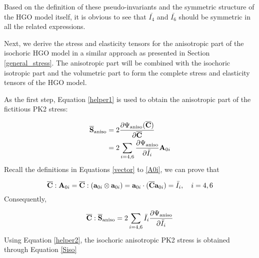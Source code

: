 Based on the definition of these pseudo-invariants and the symmetric structure of the HGO model itself, it is obvious to see that $\bar{I_4}$ and $\bar{I_6}$ should be symmetric in all the related expressions. 

Next, we derive the stress and elasticity tensors for the anisotropic part of the isochoric HGO model in a similar approach as presented in Section \ref{general_stress}. The anisotropic part will be combined with the isochoric isotropic part and the volumetric part to form the complete stress and elasticity tensors of the HGO model.

As the first step, Equation \ref{helper1} is used to obtain the anisotropic part of the fictitious PK2 stress:

\begin{equation} \label{Sbar3}
\begin{split}
\overline{\bold{S}}_\mathrm{aniso} &=  2\frac{\partial\Psi_\mathrm{aniso}({\overline{\bold{C}})}}{\partial\overline{\bold{C}}} \\
&= 2\sum_{i = 4, 6}\frac{\partial{\Psi_\mathrm{aniso}}}{\partial{\bar{I}_i}}\bold{A}_{0i} 
\end{split}
\end{equation}
Recall the definitions in Equations \ref{vector} to \ref{A0i}, we can prove that

\begin{equation}
\overline{\bold{C}} : \bold{A}_{0i} = \overline{\bold{C}} : (\bold{a}_{0i} \otimes \bold{a}_{0i}) = \bold{a}_{0i} \cdot (\overline{\bold{C}} \bold{a}_{0i}) = \bar{I}_i, \quad i = 4, 6
\end{equation}
Consequently, 

\begin{equation} \label{helper2}
\overline{\bold{C}} : \overline{\bold{S}}_\mathrm{aniso} = 2\sum_{i = 4, 6} \bar{I}_i \frac{\partial{\Psi_\mathrm{aniso}}}{\partial{\bar{I}_i}}  
\end{equation}
Using Equation \ref{helper2}, the isochoric anisotropic PK2 stress is obtained through Equation \ref{Siso}

